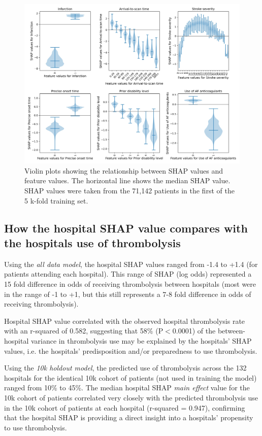 \begin{figure}[!h]
\centering
\includegraphics[width=1\textwidth]{./images/03_xgb_10_features_thrombolysis_shap_violin}
\caption{Violin plots showing the relationship between SHAP values and feature values. The horizontal line shows the median SHAP value. SHAP values were taken from the 71,142 patients in the first of the 5 k-fold training set.}
\label{fig:results_shap_violin}
\end{figure}


\subsection{How the hospital SHAP value compares with the hospitals use of thrombolysis}

Using the \emph{all data model}, the hospital SHAP values ranged from -1.4 to +1.4 (for patients attending each hospital). This range of SHAP (log odds) represented a 15 fold difference in odds of receiving thrombolysis between hospitals (most were in the range of -1 to +1, but this still represents a 7-8 fold difference in odds of receiving thrombolysis).

Hospital SHAP value correlated with the observed hospital thrombolysis rate with an r-squared of 0.582, suggesting that 58\% (P$<$0.0001) of the between-hospital variance in thrombolysis use may be explained by the hospitals' SHAP values, i.e. the hospitals' predisposition and/or preparedness to use thrombolysis.

Using the \emph{10k holdout model}, the predicted use of thrombolysis across the 132 hospitals for the identical 10k cohort of patients (not used in training the model) ranged from 10\% to 45\%. The median hospital SHAP \emph{main effect} value for the 10k cohort of patients correlated very closely with the predicted thrombolysis use in the 10k cohort of patients at each hospital (r-squared = 0.947), confirming that the hospital SHAP is providing a direct insight into a hospitals' propensity to use thrombolysis.

